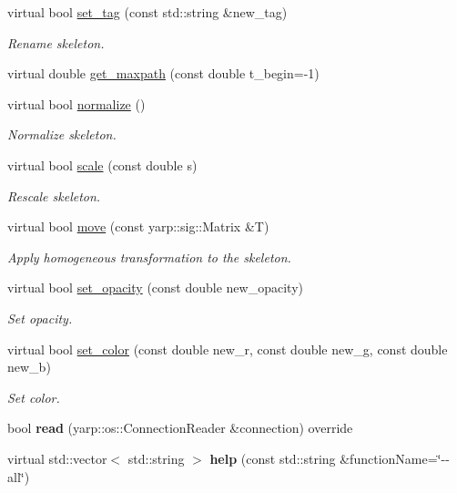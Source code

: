 \begin{DoxyCompactItemize}
virtual bool \hyperlink{classskeletonPlayer__IDL_a3a4632867441416e3606b814b5a99fba}{set\+\_\+tag} (const std\+::string \&new\+\_\+tag)
\begin{DoxyCompactList}\small\item\em Rename skeleton. \end{DoxyCompactList}\item 
virtual double \hyperlink{classskeletonPlayer__IDL_adf73eb4c86d9d8a19149b29db4284538}{get\+\_\+maxpath} (const double t\+\_\+begin=-\/1)
\item 
virtual bool \hyperlink{classskeletonPlayer__IDL_ab77b1ce1855a8fbdc352ac22ed9a6cf4}{normalize} ()
\begin{DoxyCompactList}\small\item\em Normalize skeleton. \end{DoxyCompactList}\item 
virtual bool \hyperlink{classskeletonPlayer__IDL_ac70d533dc6ed1e642e0e03e639b6658c}{scale} (const double s)
\begin{DoxyCompactList}\small\item\em Rescale skeleton. \end{DoxyCompactList}\item 
virtual bool \hyperlink{classskeletonPlayer__IDL_a0419e3b52e359f4b1fe9c8efba2db38e}{move} (const yarp\+::sig\+::\+Matrix \&T)
\begin{DoxyCompactList}\small\item\em Apply homogeneous transformation to the skeleton. \end{DoxyCompactList}\item 
virtual bool \hyperlink{classskeletonPlayer__IDL_ad25203e961712205d87429065935c195}{set\+\_\+opacity} (const double new\+\_\+opacity)
\begin{DoxyCompactList}\small\item\em Set opacity. \end{DoxyCompactList}\item 
virtual bool \hyperlink{classskeletonPlayer__IDL_aceb3db0756cc78fd54088bfb2a8b9c39}{set\+\_\+color} (const double new\+\_\+r, const double new\+\_\+g, const double new\+\_\+b)
\begin{DoxyCompactList}\small\item\em Set color. \end{DoxyCompactList}\item 
\mbox{\label{classskeletonPlayer__IDL_a5ef1b1ea76e8641c56ce9866b6a0e5bc}} 
bool {\bfseries read} (yarp\+::os\+::\+Connection\+Reader \&connection) override
\item 
\mbox{\label{classskeletonPlayer__IDL_a1425684521df6a0b5591f9284aea9d65}} 
virtual std\+::vector$<$ std\+::string $>$ {\bfseries help} (const std\+::string \&function\+Name=\char`\"{}-\/-\/all\char`\"{})
\end{DoxyCompactItemize}


